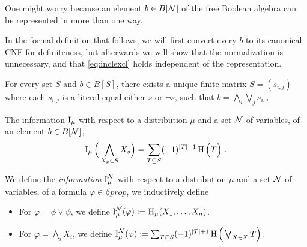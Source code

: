 \documentclass{article}
\begin{document}
    One might worry because an element $b \in B[\mathcal N]$ of the free Boolean algebra can be represented in more than one way.

    \begin{inactive}
        In the formal definition that follows, we will first convert every $b$ to its canonical CNF for definiteness, but  afterwards we will show that the normalization is unnecessary, and that \eqref{eq:inclexcl} holds independent of the representation.

        \begin{fact}
            For every set $S$ and $b \in B[S]$, there exists a unique finite matrix $S = (s_{i,j})$ where each $s_{i,j}$ is a literal equal either $s$ or $\lnot s$, such that
            $\displaystyle b = \bigwedge_{i} \bigvee_{j} s_{i,j} $
        \end{fact}
        \begin{defn}
            The information $\operatorname{\mathrm{I}}_\mu$ with respect to a distribution $\mu$ and a set $\mathcal N$ of variables, of an element $b \in B[\mathcal N]$,
            \[          \operatorname{\mathrm{I}}_\mu\Big(\bigwedge_{X_x \in S} X_s\Big) =  \sum_{T \subseteq S} (-1)^{|T|+1} \operatorname{\mathrm{H}}\Big( T \Big) ~. \]
        \end{defn}
    \end{inactive}


\begin{defn}
    We define the \emph{information} $\operatorname{\mathrm{I}}_\mu^\mathcal N$ with respect to a distribution $\mu$ and a set $\mathcal N$ of variables, of a formula $\varphi \in \lang{prop}$, we inductively define
            \begin{itemize}[itemsep=0pt, parsep=1pt]
                \item For $\varphi = \phi \lor \psi$, we define $\operatorname{\mathrm{I}}^\mathcal N_\mu(\varphi) := \operatorname{\mathrm{H}}_\mu(X_1, \ldots, X_n)$.
                \item For $\varphi = \bigwedge_i X_i$, we define $\operatorname{\mathrm{I}}^\mathcal N_\mu(\varphi)
                     := \sum_{T \subseteq S} (-1)^{|T|+1} \operatorname{\mathrm{H}}\Big(\bigvee_{X \in X} T\Big)$.
            \end{itemize}
\end{defn}
\end{document}
